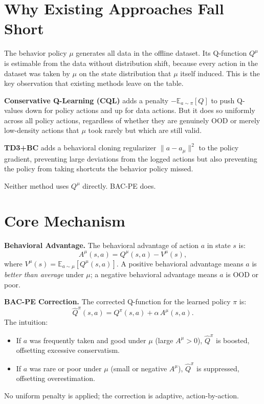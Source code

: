 \documentclass[10pt,twocolumn]{article}
\begin{document}
\section{Why Existing Approaches Fall Short}

The behavior policy $\mu$ generates all data in the offline dataset. Its Q-function
$Q^\mu$ is estimable from the data without distribution shift, because every action
in the dataset was taken by $\mu$ on the state distribution that $\mu$ itself induced.
This is the key observation that existing methods leave on the table.

\textbf{Conservative Q-Learning (CQL)} adds a penalty $-\mathbb{E}_{a \sim \pi}[Q]$
to push Q-values down for policy actions and up for data actions. But it does so
uniformly across all policy actions, regardless of whether they are genuinely OOD or
merely low-density actions that $\mu$ took rarely but which are still valid.

\textbf{TD3+BC} adds a behavioral cloning regularizer $\|a - a_\mu\|^2$ to the
policy gradient, preventing large deviations from the logged actions but also
preventing the policy from taking shortcuts the behavior policy missed.

Neither method uses $Q^\mu$ directly. BAC-PE does.

\section{Core Mechanism}

\textbf{Behavioral Advantage.}
The behavioral advantage of action $a$ in state $s$ is:
\[
A^\mu(s, a) = Q^\mu(s, a) - V^\mu(s),
\]
where $V^\mu(s) = \mathbb{E}_{a \sim \mu}[Q^\mu(s,a)]$.
A positive behavioral advantage means $a$ is \emph{better than average} under $\mu$;
a negative behavioral advantage means $a$ is OOD or poor.

\textbf{BAC-PE Correction.}
The corrected Q-function for the learned policy $\pi$ is:
\[
\hat{Q}^\pi(s, a) = Q^\pi(s, a) + \alpha\,A^\mu(s, a).
\]
The intuition:
\begin{itemize}[itemsep=2pt,parsep=0pt]
  \item If $a$ was frequently taken and good under $\mu$ (large $A^\mu > 0$),
    $\hat{Q}^\pi$ is boosted, offsetting excessive conservatism.
  \item If $a$ was rare or poor under $\mu$ (small or negative $A^\mu$),
    $\hat{Q}^\pi$ is suppressed, offsetting overestimation.
\end{itemize}
No uniform penalty is applied; the correction is adaptive, action-by-action.
\end{document}

